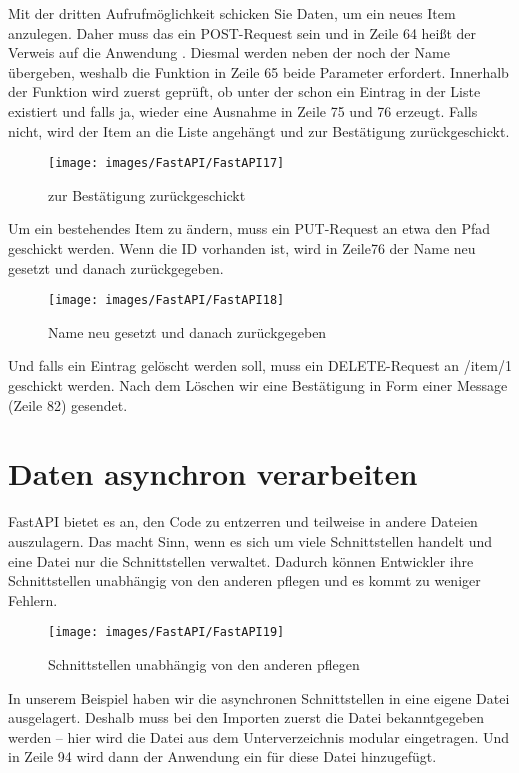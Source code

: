 Mit der dritten Aufrufmöglichkeit schicken Sie Daten, um ein neues Item anzulegen. Daher muss das ein POST-Request sein und in Zeile 64 heißt der Verweis auf die Anwendung . Diesmal werden neben der  noch der Name übergeben, weshalb die Funktion in Zeile 65 beide Parameter erfordert. Innerhalb der Funktion wird zuerst geprüft, ob unter der  schon ein Eintrag in der Liste existiert und falls ja, wieder eine Ausnahme in Zeile 75 und 76 erzeugt. Falls nicht, wird der Item an die Liste angehängt und zur Bestätigung zurückgeschickt.

\begin{figure}
    \texttt{[image: images/FastAPI/FastAPI17]}
    \caption{ zur Bestätigung zurückgeschickt} \label{FastAPI17}
\end{figure}


Um ein bestehendes Item zu ändern, muss ein PUT-Request an etwa den Pfad  geschickt werden. Wenn die ID vorhanden ist, wird in Zeile76 der Name neu gesetzt und danach zurückgegeben.

\begin{figure}
    \texttt{[image: images/FastAPI/FastAPI18]}
    \caption{Name neu gesetzt und danach zurückgegeben} \label{FastAPI18}
\end{figure}

Und falls ein Eintrag gelöscht werden soll, muss ein DELETE-Request an /item/1 geschickt werden. Nach dem Löschen wir eine Bestätigung in Form einer Message (Zeile 82) gesendet.

\section{Daten asynchron verarbeiten}

FastAPI bietet es an, den Code zu entzerren und teilweise in andere Dateien auszulagern. Das macht Sinn, wenn es sich um viele Schnittstellen handelt und eine Datei nur die Schnittstellen verwaltet. Dadurch können Entwickler ihre Schnittstellen unabhängig von den anderen pflegen und es kommt zu weniger Fehlern.

\begin{figure}
    \texttt{[image: images/FastAPI/FastAPI19]}
    \caption{Schnittstellen unabhängig von den anderen pflegen} \label{FastAPI19}
\end{figure}


In unserem Beispiel haben wir die asynchronen Schnittstellen in eine eigene Datei ausgelagert. Deshalb muss bei den Importen zuerst die Datei bekanntgegeben werden -- hier wird die Datei  aus dem Unterverzeichnis modular eingetragen. Und in Zeile 94 wird dann der Anwendung ein  für diese Datei hinzugefügt.

